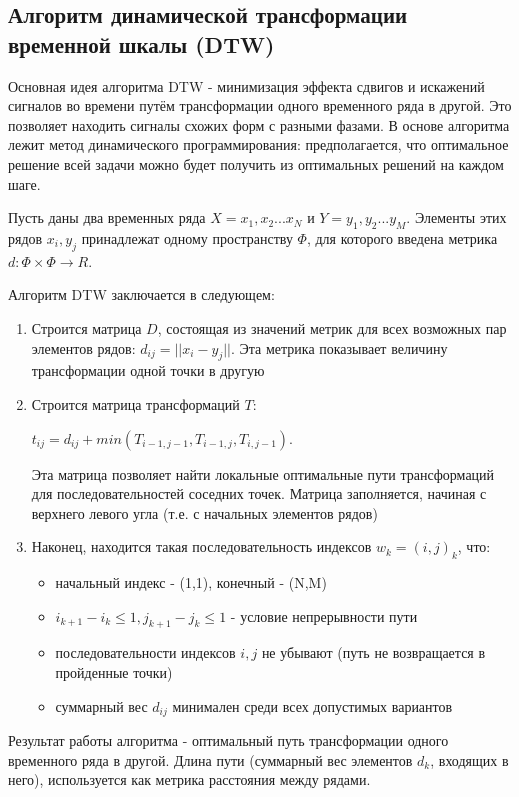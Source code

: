 \subsection{Алгоритм динамической трансформации временной шкалы (DTW)}

Основная идея алгоритма DTW - минимизация эффекта сдвигов и искажений сигналов во времени путём трансформации одного временного ряда в другой. Это позволяет находить сигналы схожих форм с разными фазами\cite{dtw_review}. В основе алгоритма лежит метод динамического программирования: предполагается, что оптимальное решение всей задачи можно будет получить из оптимальных решений на каждом шаге. 

Пусть даны два временных ряда $X=x_1,x_2...x_N$ и $Y=y_1,y_2...y_M$. Элементы этих рядов $x_i,y_j$ принадлежат одному пространству $\Phi$, для которого введена метрика $d: \Phi \times \Phi \to R$. 

Алгоритм DTW заключается в следующем:

\begin{enumerate}
\item Строится матрица $D$, состоящая из значений метрик для всех возможных пар элементов рядов: $d_{ij}=|| x_i-y_j ||$. Эта метрика показывает величину трансформации одной точки в другую
\item Строится матрица трансформаций $T$:

$t_{ij}=d_{ij}+min(T_{i-1,j-1},T_{i-1,j},T_{i,j-1})$. 

Эта матрица позволяет найти локальные оптимальные пути трансформаций для последовательностей соседних точек. Матрица заполняется, начиная с верхнего левого угла (т.е. с начальных элементов рядов)
\item Наконец, находится такая последовательность индексов $w_k=(i,j)_k$, что:
  \begin{itemize}
  \item начальный индекс - (1,1), конечный - (N,M)
  \item $i_{k+1}-i_k \leq 1, j_{k+1}-j_k \leq 1$ - условие непрерывности пути
  \item последовательности индексов $i, j$ не убывают (путь не возвращается в пройденные точки)
  \item суммарный вес $d_{ij}$ минимален среди всех допустимых вариантов
  \end{itemize}
\end{enumerate}

Результат работы алгоритма - оптимальный путь трансформации одного временного ряда в другой. Длина пути (суммарный вес элементов $d_k$, входящих в него), используется как метрика расстояния между рядами. 

